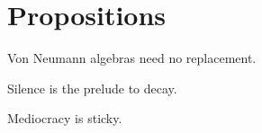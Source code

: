 \documentclass[a]{subfiles}
\begin{document}
\chapter{Propositions}
\begin{parsec}%
Von Neumann algebras
need no replacement.
\end{parsec}
\begin{parsec}%
Silence is the prelude to decay.
\end{parsec}
\begin{parsec}%
Mediocracy is sticky.
\end{parsec}
\end{document}

